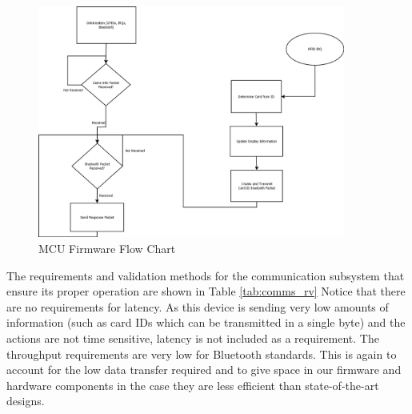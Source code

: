 \documentclass[12pt]{article}
\begin{document}
\begin{figure}[!h]
	\centering
	\includegraphics[width=0.9\textwidth]{MCU_Flow.png}
	\caption{MCU Firmware Flow Chart}
	\label{fig:MCU_flow}
\end{figure}

The requirements and validation methods for the communication subsystem that ensure its proper operation are shown in Table \ref{tab:comms_rv} Notice that there are no requirements for latency. As this device is sending very low amounts of information (such as card IDs which can be transmitted in a single byte) and the actions are not time sensitive, latency is not included as a requirement. The throughput requirements are very low for Bluetooth standards. This is again to account for the low data transfer required and to give space in our firmware and hardware components in the case they are less efficient than state-of-the-art designs.
\end{document}
